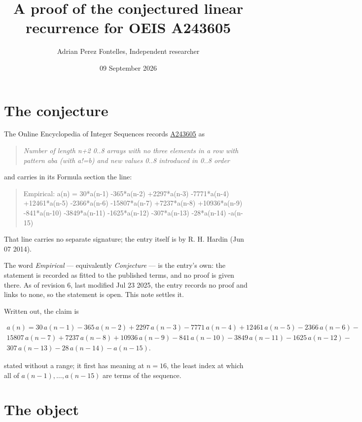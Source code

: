 \documentclass[11pt]{article}
\title{A proof of the conjectured linear recurrence for OEIS A243605}
\author{Adrian Perez Fontelles, Independent researcher}
\date{09 September 2026}
\theoremstyle{definition}
\begin{document}
\maketitle
\section{The conjecture}

The Online Encyclopedia of Integer Sequences records \href{https://oeis.org/A243605}{A243605} as

\begin{quote}\itshape Number of length n+2 0..8 arrays with no three elements in a row with pattern aba (with a!=b) and new values 0..8 introduced in 0..8 order\end{quote}

and carries in its Formula section the line:

\begin{quote}\ttfamily Empirical: a(n) = 30*a(n-1) -365*a(n-2) +2297*a(n-3) -7771*a(n-4) +12461*a(n-5) -2366*a(n-6) -15807*a(n-7) +7237*a(n-8) +10936*a(n-9) -841*a(n-10) -3849*a(n-11) -1625*a(n-12) -307*a(n-13) -28*a(n-14) -a(n-15)\end{quote}

That line carries no separate signature; the entry itself is by R. H. Hardin (Jun 07 2014).

The word {\itshape Empirical} --- equivalently {\itshape Conjecture} --- is the entry's own: the statement is recorded as fitted to the published terms, and no proof is given there. As of revision 6, last modified Jul 23 2025, the entry records no proof and links to none, so the statement is open. This note settles it.

Written out, the claim is

\begin{multline*} a(n) = 30\,a(n-1) - 365\,a(n-2) + 2297\,a(n-3) - 7771\,a(n-4) + 12461\,a(n-5) - 2366\,a(n-6) - \\ 15807\,a(n-7) + 7237\,a(n-8) + 10936\,a(n-9) - 841\,a(n-10) - 3849\,a(n-11) - 1625\,a(n-12) - \\ 307\,a(n-13) - 28\,a(n-14) - a(n-15). \end{multline*}

stated without a range; it first has meaning at $n = 16$, the least index at which all of $a(n-1),\dots,a(n-15)$ are terms of the sequence.

\section{The object}
\end{document}
